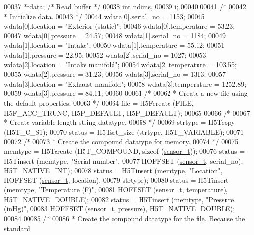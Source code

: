 \begin{DoxyCode}
00037                 *rdata;                     \textcolor{comment}{/* Read buffer */}
00038     \textcolor{keywordtype}{int}         ndims,
00039                 i;
00040 
00041     \textcolor{comment}{/*}
00042 \textcolor{comment}{     * Initialize data.}
00043 \textcolor{comment}{     */}
00044     wdata[0].serial\_no = 1153;
00045     wdata[0].location = \textcolor{stringliteral}{"Exterior (static)"};
00046     wdata[0].temperature = 53.23;
00047     wdata[0].pressure = 24.57;
00048     wdata[1].serial\_no = 1184;
00049     wdata[1].location = \textcolor{stringliteral}{"Intake"};
00050     wdata[1].temperature = 55.12;
00051     wdata[1].pressure = 22.95;
00052     wdata[2].serial\_no = 1027;
00053     wdata[2].location = \textcolor{stringliteral}{"Intake manifold"};
00054     wdata[2].temperature = 103.55;
00055     wdata[2].pressure = 31.23;
00056     wdata[3].serial\_no = 1313;
00057     wdata[3].location = \textcolor{stringliteral}{"Exhaust manifold"};
00058     wdata[3].temperature = 1252.89;
00059     wdata[3].pressure = 84.11;
00060 
00061     \textcolor{comment}{/*}
00062 \textcolor{comment}{     * Create a new file using the default properties.}
00063 \textcolor{comment}{     */}
00064     file = H5Fcreate (FILE, H5F\_ACC\_TRUNC, H5P\_DEFAULT, H5P\_DEFAULT);
00065 
00066     \textcolor{comment}{/*}
00067 \textcolor{comment}{     * Create variable-length string datatype.}
00068 \textcolor{comment}{     */}
00069     strtype = H5Tcopy (H5T\_C\_S1);
00070     status = H5Tset\_size (strtype, H5T\_VARIABLE);
00071 
00072     \textcolor{comment}{/*}
00073 \textcolor{comment}{     * Create the compound datatype for memory.}
00074 \textcolor{comment}{     */}
00075     memtype = H5Tcreate (H5T\_COMPOUND, \textcolor{keyword}{sizeof} (\hyperlink{structsensor__t}{sensor\_t}));
00076     status = H5Tinsert (memtype, \textcolor{stringliteral}{"Serial number"},
00077                 HOFFSET (\hyperlink{structsensor__t}{sensor\_t}, serial\_no), H5T\_NATIVE\_INT);
00078     status = H5Tinsert (memtype, \textcolor{stringliteral}{"Location"}, HOFFSET (\hyperlink{structsensor__t}{sensor\_t}, location),
00079                 strtype);
00080     status = H5Tinsert (memtype, \textcolor{stringliteral}{"Temperature (F)"},
00081                 HOFFSET (\hyperlink{structsensor__t}{sensor\_t}, temperature), H5T\_NATIVE\_DOUBLE);
00082     status = H5Tinsert (memtype, \textcolor{stringliteral}{"Pressure (inHg)"},
00083                 HOFFSET (\hyperlink{structsensor__t}{sensor\_t}, pressure), H5T\_NATIVE\_DOUBLE);
00084 
00085     \textcolor{comment}{/*}
00086 \textcolor{comment}{     * Create the compound datatype for the file.  Because the standard}

\end{DoxyCode}
